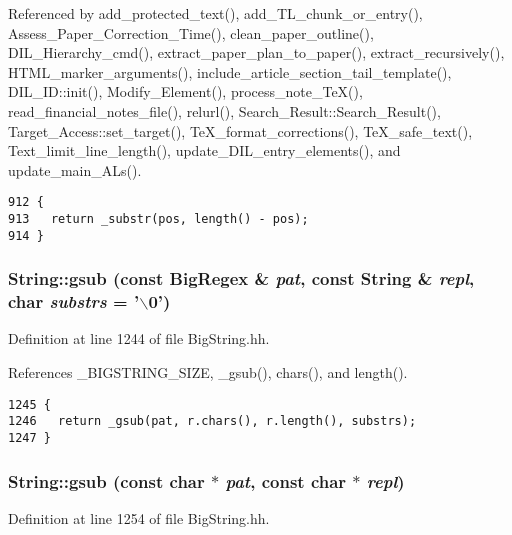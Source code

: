 Referenced by add\_\-protected\_\-text(), add\_\-TL\_\-chunk\_\-or\_\-entry(), Assess\_\-Paper\_\-Correction\_\-Time(), clean\_\-paper\_\-outline(), DIL\_\-Hierarchy\_\-cmd(), extract\_\-paper\_\-plan\_\-to\_\-paper(), extract\_\-recursively(), HTML\_\-marker\_\-arguments(), include\_\-article\_\-section\_\-tail\_\-template(), DIL\_\-ID::init(), Modify\_\-Element(), process\_\-note\_\-Te\-X(), read\_\-financial\_\-notes\_\-file(), relurl(), Search\_\-Result::Search\_\-Result(), Target\_\-Access::set\_\-target(), Te\-X\_\-format\_\-corrections(), Te\-X\_\-safe\_\-text(), Text\_\-limit\_\-line\_\-length(), update\_\-DIL\_\-entry\_\-elements(), and update\_\-main\_\-ALs().



\footnotesize\begin{verbatim}912 {
913   return _substr(pos, length() - pos);
914 }
\end{verbatim}\normalsize 
{}
\subsubsection{ String::gsub (const {\bf Big\-Regex} \& {\em pat}, const String \& {\em repl}, char {\em substrs} = '$\backslash$0')\hspace{0.3cm}{\tt  [inline]}}\label{classString_a93}




Definition at line 1244 of file Big\-String.hh.

References \_\-BIGSTRING\_\-SIZE, \_\-gsub(), chars(), and length().



\footnotesize\begin{verbatim}1245 {
1246   return _gsub(pat, r.chars(), r.length(), substrs);
1247 }
\end{verbatim}\normalsize 
{}
\subsubsection{ String::gsub (const char $\ast$ {\em pat}, const char $\ast$ {\em repl})\hspace{0.3cm}{\tt  [inline]}}\label{classString_a92}




Definition at line 1254 of file Big\-String.hh.

